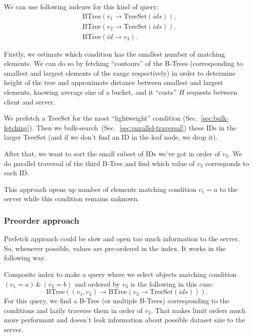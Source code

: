 \documentclass[notitlepage]{revtex4-1}
\begin{document}
We can use following indexes for this kind of query:
\begin{align*}
    & \mbox{BTree}(v_1 \rightarrow \mbox{TreeSet}(ids)),\\
    & \mbox{BTree}(v_2 \rightarrow \mbox{TreeSet}(ids)),\\
    & \mbox{BTree}(id \rightarrow v_3).
\end{align*}

Firstly, we estimate which condition has the smallest number of matching elements.
We can do so by fetching ``contours'' of the B-Trees (corresponding to smallest and largest elements of the range respectively) in order to determine height of the tree and approximate distance between smallest and largest elements, knowing average size of a bucket, and it ``costs'' $H$ requests between client and server.

We prefetch a TreeSet for the most ``lightweight'' condition (Sec.~\ref{sec:bulk-fetching}).
Then we bulk-search~(Sec.~\ref{sec:parallel-traversal}) these IDs in the larger TreeSet (and if we don't find an ID in the leaf node, we drop it).

After that, we want to sort the small subset of IDs we've got in order of $v_3$.
We do parallel traversal of the third B-Tree and find which value of $v_3$ corresponds to each ID.

This approach opens up number of elements matching condition $v_1=a$ to the server while this condition remains unknown.

\subsubsection{Preorder approach}

Prefetch approach could be slow and open too much information to the server.
So, whenever possible, values are pre-ordered in the index.
It works in the following way.

Composite index to make a query where we select objects matching condition $(v_1 = a) \,\&\, (v_2 = b)$ and ordered by $v_3$ is the following in this case:
\begin{equation*}
    \mbox{BTree}((v_1, v_2) \rightarrow \mbox{BTree}(v_3 \rightarrow \mbox{TreeSet}(ids))).
\end{equation*}
For this query, we find a B-Tree (or multiple B-Trees) corresponding to the conditions and lazily traverse them in order of $v_3$.
That makes limit orders much more performant and doesn't leak information about possible dataset size to the server.
\end{document}
